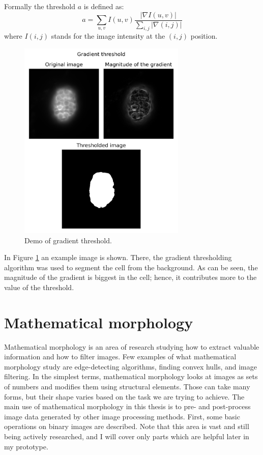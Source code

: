\documentclass[
  digital,     %
  oneside,     %
  nosansbold,  %
  nocolorbold, %
  lof,         %
  lot,         %
]{fithesis4}
\begin{document}
Formally the threshold $a$ is defined as:
$$a = \sum_{u, v} I(u, v) \frac{|\nabla I(u, v)|}{\sum_{i, j} |\nabla(i,j)|}$$
where $I(i, j)$ stands for the image intensity at the $(i, j)$ position.

\begin{figure}
    \begin{center}
        \includegraphics[width=8cm]{"resources/demo-gradient-threshold.png"}
    \end{center}
    \caption{Demo of gradient threshold.}
    \label{fig:demo_grad_thresh}
\end{figure}

In Figure \ref{fig:demo_grad_thresh} an example image is shown. There, the
gradient thresholding algorithm was used to segment the cell from the
background. As can be seen, the magnitude of the gradient is biggest in the
cell; hence, it contributes more to the value of the threshold.

\section{Mathematical morphology}

Mathematical morphology is an area of research studying how to extract valuable
information and how to filter images. Few examples of what mathematical
morphology study are edge-detecting algorithms, finding convex hulls, and image
filtering. In the simplest terms, mathematical morphology looks at images as
sets of numbers and modifies them using structural elements. Those can take many
forms, but their shape varies based on the task we are trying to achieve. The
main use of mathematical morphology in this thesis is to pre- and post-process
image data generated by other image processing methods. First, some basic
operations on binary images are described. Note that this area is vast and still
being actively researched, and I will cover only parts which are helpful later
in my prototype.
\end{document}
